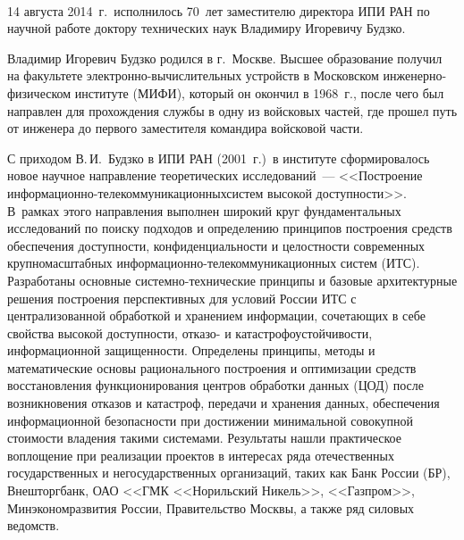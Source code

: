           \begin{multicols}{2}


\begin{center}
\vspace*{1pt}
\mbox{%
\epsfxsize=78mm
}
\end{center}

\vspace*{12pt}

      14 августа 2014~г.\ исполнилось 70~лет за\-мес\-ти\-те\-лю директора ИПИ РАН по
научной работе доктору технических наук Владимиру Игоревичу Будзко.

      Владимир Игоревич Будзко родился в г.~Москве. Высшее образование получил на факультете
элект\-рон\-но-вы\-чис\-ли\-тель\-ных устройств в Московском
ин\-же\-нер\-но-фи\-зи\-че\-ском институте
(МИФИ), который он окончил в 1968~г., после чего был на\-прав\-лен для прохождения
службы в одну из войс\-ко\-вых частей, где прошел путь от инженера до первого заместителя
командира войсковой части.

      С приходом В.\,И.~Будзко в ИПИ РАН (2001~г.)\ в институте
сформировалось новое научное на\-прав\-ле\-ние теоретических исследований~--- <<Постро\-ение
ин\-фор\-ма\-ци\-он\-но-те\-ле\-ком\-му\-ни\-ка\-ци\-он\-ных\linebreak сис\-тем
высокой до\-ступ\-ности>>. В~рамках этого
направления выполнен широкий круг фундаментальных исследований по поиску подходов и
определению принципов построения средств обеспечения доступности, конфиденциальности
и целостности современных крупномасштабных
ин\-фор\-ма\-ци\-он\-но-те\-ле\-ком\-му\-ни\-ка\-ци\-он\-ных
сис\-тем (ИТС). Разработаны основные сис\-тем\-но-тех\-ни\-че\-ские принципы и базовые
архитектурные решения построения перспективных для условий России ИТС с
централизованной обработкой и хранением информации, сочетающих в себе свойства
высокой доступности, отказо- и катастрофоустойчивости, информационной защищенности.
Определены принципы, методы и математические основы рационального построения и
оптимизации средств восстановления функционирования центров обработки данных (ЦОД)
после возникновения отказов и катастроф, передачи и хранения данных, обеспечения
информационной безопасности при достижении минимальной совокупной стоимости
владения такими системами. Результаты нашли практическое воплощение при реализации
проектов в интересах ряда отечественных государственных и негосударственных
организаций, таких как Банк России (БР), Внешторгбанк, ОАО <<ГМК <<Норильский Никель>>,
<<Газпром>>, Минэкономразвития России, Правительство Москвы, а также ряд силовых
ведомств.


\end{multicols}
